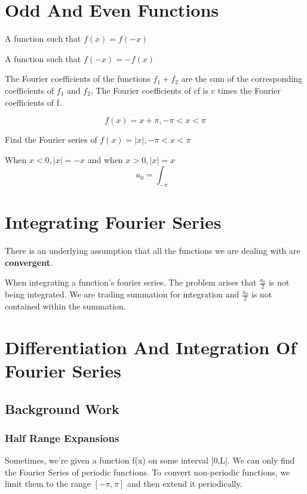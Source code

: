 \documentclass[twoside]{report}
\begin{document}
\section{Odd And Even Functions} %
\label{sec:Odd And Even Functions}

\begin{definition}
   A function such that $f(x) = f(-x)$
   \label{dfn2}
\end{definition} %
\begin{definition}
   A function such that $f(-x) = -f(x)$
   \label{dfn3}
\end{definition}

\begin{theorem}
    The Fourier coefficients of the functions $f_1 + f_2$ are the sum of the corresponding coefficients of $f_1$ and $f_2$, The Fourier coefficients of cf is c times the Fourier coefficients of f.

\end{theorem}
\[f(x) = x + \pi , -\pi < x < \pi\] 


\begin{question}
    Find the Fourier series of $f(x) = |x|, -\pi < x < \pi$
\end{question}
\begin{solution}
    When $x < 0, |x| = -x$ and when $x>0, |x| = x$ 
    \[
    a_0 = \int_{-\pi}
    \]
\end{solution}

\section{Integrating Fourier Series}
There is an underlying assumption that all the functions we are dealing with are \textbf{convergent}.

When integrating a function's fourier series. The problem arises that $\frac{a_0}{2}$ is not being integrated. We are trading summation for integration and $\frac{a_0}{2}$ is not contained within the summation.


\section{Differentiation And Integration Of Fourier Series}
\subsection{Background Work}
\subsubsection{Half Range Expansions}
Sometimes, we're given a function f(x) on some interval [0,L].  We can only find the Fourier Series of periodic functions. To convert non-periodic functions, we limit them to the range $[-\pi,\pi]$ and then extend it periodically.
\end{document}
